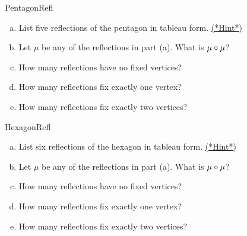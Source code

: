 \begin{exercise}{PentagonRefl}
\begin{enumerate}[(a)]
\item
List five reflections of the pentagon in tableau form.
\hyperref[sec:symmetries:hints]{(*Hint*)}
\item
Let $\mu$ be any of the reflections in part (a). What is $\mu \circ \mu$?
\item
How many reflections have no fixed vertices?
\item
How many reflections fix exactly one vertex?
\item
How many reflections fix exactly two vertices?

\end{enumerate}
\end{exercise}

\begin{exercise}{HexagonRefl}
\begin{enumerate}[(a)]
\item
List six reflections of the hexagon in tableau form.
\hyperref[sec:symmetries:hints]{(*Hint*)}
\item
Let $\mu$ be any of the reflections in part (a). What is $\mu \circ \mu$?
\item
How many reflections have no fixed vertices?
\item
How many reflections fix exactly one vertex?
\item
How many reflections fix exactly two vertices?

\end{enumerate}
\end{exercise}

